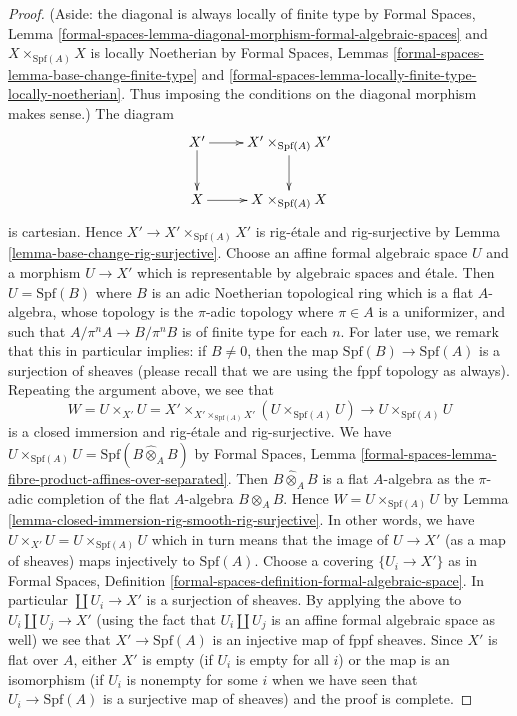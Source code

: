 \documentclass[10pt,a4paper]{amsart}
\theoremstyle{plain}
\theoremstyle{definition}
\theoremstyle{remark}
\numberwithin{equation}{subsection}
\begin{document}
\begin{proof}
(Aside: the diagonal is always locally of finite type by
Formal Spaces, Lemma
\ref{formal-spaces-lemma-diagonal-morphism-formal-algebraic-spaces}
and $X \times_{\text{Spf}(A)} X$ is locally Noetherian by
Formal Spaces, Lemmas
\ref{formal-spaces-lemma-base-change-finite-type} and
\ref{formal-spaces-lemma-locally-finite-type-locally-noetherian}.
Thus imposing the conditions on the diagonal morphism makes sense.)
The diagram
$$
\xymatrix{
X' \ar[r] \ar[d] & X' \times_{\text{Spf}(A)} X' \ar[d] \\
X \ar[r] & X \times_{\text{Spf}(A)} X
}
$$
is cartesian. Hence $X' \to X' \times_{\text{Spf}(A)} X'$
is rig-\'etale and rig-surjective by
Lemma \ref{lemma-base-change-rig-surjective}.
Choose an affine formal algebraic space $U$ and a morphism
$U \to X'$ which is representable by algebraic spaces and \'etale.
Then $U = \text{Spf}(B)$ where $B$ is an adic Noetherian topological ring
which is a flat $A$-algebra, whose topology is the $\pi$-adic
topology where $\pi \in A$ is a uniformizer, and such that
$A/\pi^n A \to B/\pi^n B$ is of finite type for each $n$.
For later use, we remark that this in particular implies: if $B \not = 0$,
then the map $\text{Spf}(B) \to \text{Spf}(A)$ is a surjection
of sheaves (please recall that we are using the fppf topology
as always). Repeating the argument above, we see that
$$
W = U \times_{X'} U =
X' \times_{X' \times_{\text{Spf}(A)} X'} (U \times_{\text{Spf}(A)} U)
\longrightarrow
U \times_{\text{Spf}(A)} U
$$
is a closed immersion and rig-\'etale and rig-surjective. We have
$U \times_{\text{Spf}(A)} U = \text{Spf}(B \widehat{\otimes}_A B)$
by Formal Spaces, Lemma
\ref{formal-spaces-lemma-fibre-product-affines-over-separated}.
Then $B \widehat{\otimes}_A B$ is a flat $A$-algebra
as the $\pi$-adic completion of the flat $A$-algebra $B \otimes_A B$.
Hence $W = U \times_{\text{Spf}(A)} U$ by
Lemma \ref{lemma-closed-immersion-rig-smooth-rig-surjective}.
In other words, we have $U \times_{X'} U = U \times_{\text{Spf}(A)} U$
which in turn means that the image of $U \to X'$ (as a map of sheaves)
maps injectively to $\text{Spf}(A)$.
Choose a covering $\{U_i \to X'\}$ as in Formal Spaces, Definition
\ref{formal-spaces-definition-formal-algebraic-space}.
In particular $\coprod U_i \to X'$ is a surjection of sheaves.
By applying the above to $U_i \coprod U_j \to X'$ (using the
fact that $U_i \amalg U_j$ is an affine formal algebraic space
as well) we see that $X' \to \text{Spf}(A)$ is an injective map
of fppf sheaves. Since $X'$ is flat over $A$, either $X'$ is empty
(if $U_i$ is empty for all $i$) or the map is an isomorphism
(if $U_i$ is nonempty for some $i$ when we have seen that
$U_i \to \text{Spf}(A)$ is a surjective map of sheaves)
and the proof is complete.
\end{proof}
\end{document}
